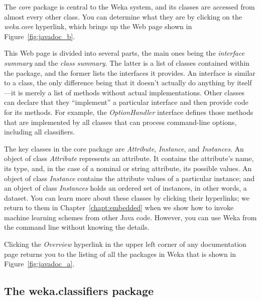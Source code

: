 The \textit{core} package is central to the Weka system, and its
classes are accessed from almost every other class. You can determine
what they are by clicking on the \textit{weka.core} hyperlink, which
brings up the Web page shown in Figure~\ref{fig:javadoc_b}.

This Web page is divided into several parts, the main ones being the
\textit{interface summary} and the \textit{class summary}. The latter
is a list of classes contained within the package, and the former
lists the interfaces it provides. An interface is similar to a class,
the only difference being that it doesn’t actually do anything by
itself---it is merely a list of methods without actual
implementations. Other classes can declare that they ``implement'' a
particular interface and then provide code for its methods. For
example, the \textit{OptionHandler} interface defines those methods
that are implemented by all classes that can process command-line
options, including all classifiers.

The key classes in the core package are \textit{Attribute},
\textit{Instance}, and \textit{Instances}. An object of class
\textit{Attribute} represents an attribute. It contains the
attribute's name, its type, and, in the case of a nominal or string
attribute, its possible values. An object of class \textit{Instance}
contains the attribute values of a particular instance; and an object
of class \textit{Instances} holds an ordered set of instances, in
other words, a dataset. You can learn more about these classes by
clicking their hyperlinks; we return to them in
Chapter~\ref{chapt:embedded} when we show how to invoke machine
learning schemes from other Java code. However, you can use Weka from
the command line without knowing the details.

Clicking the \textit{Overview} hyperlink in the upper left corner of
any documentation page returns you to the listing of all the packages
in Weka that is shown in Figure~\ref{fig:javadoc_a}.

\subsection{The weka.classifiers package}

